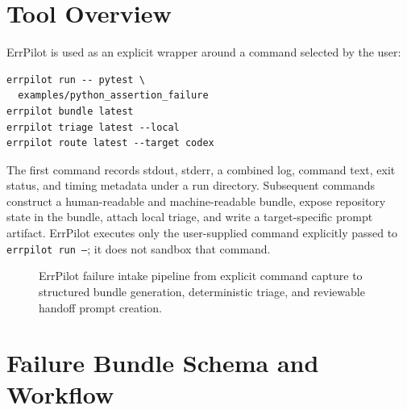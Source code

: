 \documentclass[sigconf]{acmart}
\begin{document}
\section{Tool Overview}

ErrPilot is used as an explicit wrapper around a command selected by the user:
\begin{verbatim}
errpilot run -- pytest \
  examples/python_assertion_failure
errpilot bundle latest
errpilot triage latest --local
errpilot route latest --target codex
\end{verbatim}
The first command records stdout, stderr, a combined log, command text, exit
status, and timing metadata under a run directory. Subsequent commands construct
a human-readable and machine-readable bundle, expose repository state in the
bundle, attach local triage, and write a target-specific prompt artifact.
ErrPilot executes only the user-supplied command explicitly passed to
\texttt{errpilot run --}; it does not sandbox that command.

\begin{figure}[t]
  \centering
  \caption{ErrPilot failure intake pipeline from explicit command capture to
  structured bundle generation, deterministic triage, and reviewable handoff
  prompt creation.}
  \label{fig:pipeline}
\end{figure}

\section{Failure Bundle Schema and Workflow}
\end{document}
